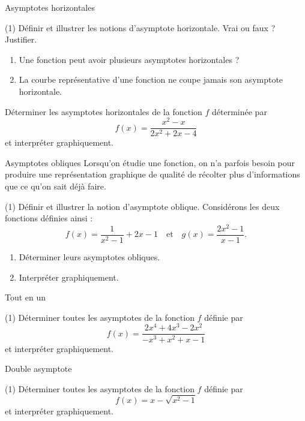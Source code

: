 \documentclass[a4paper,12pt]{article}
\begin{document}
\begin{activite}[label=acti:asyhor]{Asymptotes horizontales}
\tcblower
\begin{tasks}(1)
  \task Définir et illustrer les notions d’asymptote horizontale.
  \task Vrai ou faux ? Justifier.
    \begin{enumerate}
      \item Une fonction peut avoir plusieurs asymptotes horizontales ?
      \item La courbe représentative d’une fonction ne coupe jamais son asymptote horizontale.
    \end{enumerate}
  \task Déterminer les asymptotes horizontales de la fonction \(f\) déterminée par
  \[
    f(x)=\dfrac{x^2 - x}{2x^2 + 2x - 4}
  \]
  et interpréter graphiquement.
\end{tasks}
\end{activite}

\begin{activite}[label=acti:asyobl]{Asymptotes obliques}
\tcblower
Lorsqu'on étudie une fonction, on n'a parfois besoin pour produire une représentation graphique de qualité de récolter plus d'informations que ce qu'on sait déjà faire.
\begin{tasks}(1)
  \task Définir et illustrer la notion d'asymptote oblique.
  \task Considérons les deux fonctions définies ainsi : 
  \[
    f(x)=\dfrac{1}{x^2-1}+2x-1
    \quad\text{et}\quad
    g(x)=\dfrac{2x^2-1}{x-1}.
  \]
  \begin{enumerate}
    \item Déterminer leurs asymptotes obliques.
    \item Interpréter graphiquement.
  \end{enumerate}
\end{tasks}
\end{activite}

\begin{activite}[label=acti:asyconcl]{Tout en un}
\tcblower
\begin{tasks}(1)
  \task Déterminer toutes les asymptotes de la fonction \(f\) définie par
  \[
    f(x)=\dfrac{2x^4+4x^3-2x^2}{-x^3+x^2+x-1}
  \]
  et interpréter graphiquement.
\end{tasks}
\end{activite}

\begin{activite}[label=acti:asydouble]{Double asymptote}
\tcblower
\begin{tasks}(1)
  \task Déterminer toutes les asymptotes de la fonction \(f\) définie par
  \[
    f(x)=x-\sqrt{x^2-1}
  \]
  et interpréter graphiquement.
\end{tasks}
\end{activite}
\end{document}
